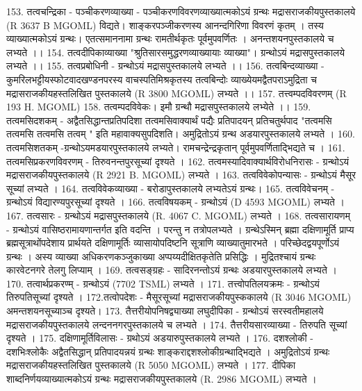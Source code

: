 153. तत्वचन्द्रिका - पञ्चीकरणव्याख्या - पञ्चीकरणविवरणव्याख्यात्मकोऽयं ग्रन्थः मद्रासराजकीयपुस्तकालये (R 3637 B MGOML) विद्यते। शाङ्करपञ्जीकरणस्य आनन्दगिरिणा विवरणं कृतम् । तस्य व्याख्यात्मकोऽयं ग्रन्थः। एतत्समाननामा ग्रन्थः रामतीर्थकृतः पूर्वमुपवर्णितः । अनन्तशयनपुस्तकालये च लभ्यते ।। 
154. तत्वदीपिकाव्याख्या "श्रुतिसारसमुद्धरणव्याख्यायाः व्याख्या"। ग्रन्थोऽयं मद्रासपुस्तकालये लभ्यते ।।
155. तत्वप्रबोधिनी - ग्रन्थोऽयं मद्रासपुस्तकालये लभ्यते ।। 
156. तत्वबिन्दव्याख्या - कुमरिलभट्टीयस्फोटवादखण्डनपरस्य वाचस्पतिमिश्रकृतस्य तत्वबिन्दोः व्याख्येयमद्वैतपराऽमुद्रिता च मद्रासराजकीयहस्तलिखित पुस्तकालये (R 3800 MGOML) लभ्यते ।। 
157. तत्त्वम्पदविवरणम् (R 193 H. MGOML) 
158. तत्वम्पदविवेकः। इमौ ग्रन्थौ मद्रासपुस्तकालये लभ्येते ।। 
159. तत्वमसिदशकम् - अद्वैतसिद्धान्तप्रतिपदिशा तत्वमसिवाक्यार्थं पद्यैः प्रतिपादयन् प्रतिचतुर्थपाद "तत्वमसि तत्वमसि तत्वमसि तत्वम् " इति महावाक्यसुपदिशति। अमुद्रितोऽयं ग्रन्थ अडयारपुस्तकालये लभ्यते ।  
160. तत्वमसिशतकम् -ग्रन्थोऽयमडयारपुस्तकालये लभ्यते। रामचन्द्रेन्द्रकृतान् पूर्वमुपवर्णिताद्भिद्यते च । 
161. तत्वमसिप्रकरणविवरणम् - तिरुवनन्तपुरसूच्यां दृश्यते ।
162. तत्वमस्यादिवाक्यार्थविरोधनिरासः - ग्रन्थोऽयं मद्रासराजकीयपुस्तकालये (R 2921 B. MGOML) लभ्यते । 
163. तत्वविवेकोपन्यासः - ग्रन्थोऽयं मैसूर सूच्यां लभ्यते । 
164. तत्वविवेकव्याख्या - बरोडापुस्तकालये लभ्यतेऽयं ग्रन्थः।
165. तत्वविवेचनम् - ग्रन्थोऽयं विद्यारण्यपुरसूच्यां दृश्यते । 
166. तत्वविषयकम् - ग्रन्थोऽयं (D 4593 MGOML) लभ्यते ।
167. तत्वसारः - ग्रन्थोऽयं मद्रासपुस्तकालये (R. 4067 C. MGOML) लभ्यते । 
168. तत्वसारायणम् - ग्रन्थोऽयं वासिष्ठरामायणान्तर्गत इति वदन्ति । परन्तु न तत्रोपलभ्यते । ग्रन्थेऽस्मिन् ब्रह्मा दक्षिणामूर्ति प्राप्य ब्रह्मसूत्राथोंपदेशाय प्रार्थयते दक्षिणामूर्तिः व्यासायोपदिष्टनि सूत्राणि व्याख्यातुमारभते । परिच्छेदद्वयपूर्णोऽयं ग्रन्थः । अस्य व्याख्या अधिकरणकञ्जुकाख्या अप्पय्यदीक्षितकृतेति प्रसिद्धिः । मुद्रितश्चायं ग्रन्थः कारवेटनगरे तेलगु लिप्याम् ।
169. तत्वसङ्ग्रहः - सादिरनन्तोऽयं ग्रन्थः अडयारपुस्तकालये लभ्यते । 
170. तत्वार्थप्रकरण्म् - ग्रन्थोऽयं (7702 TSML) लभ्यते ।
171. तत्त्वोपतिलयक्रमः - ग्रन्थोऽयं तिरुपतिसूच्यां दृश्यते ।
172.तत्वोपदेशः - मैसूरसूच्यां मद्रासराजकीयपुस्ककालये (R 3046 MGOML) अमन्तशयनसूच्याञ्च दृश्यते। 
173. तैत्तरीयोपनिषद्व्याख्या लघुदीपिका - ग्रन्थोऽयं सरस्वतीमहालये मद्रासराजकीयपुस्तकालये लन्दननगरपुस्तकालये च लभ्यते ।
174. तैत्तरीयसारव्याख्या - तिरुपति सूच्यां दृश्यते । 
175. दक्षिणामूर्तिविलासः - ग्रथोऽयं अडयारुपुस्तकालये लभ्यते । 
176. दशश्लोकी - दशभिःश्लोकैः अद्वैतसिद्धान् प्रतिपादयन्नयं ग्रन्थः शाङ्कराद्दशश्लोकीग्रन्थाद्भिद्यते । अमुद्रितोऽयं ग्रन्थः मद्रासराजकीयहस्तलिखित पुस्तकालये (R 5050 MGOML) लभ्यते । 
177. दीपिका शाब्दनिर्णयव्याख्यात्मकोऽयं ग्रन्थः मद्रासराजकीयपुस्तकालये (R. 2986 MGOML) लभ्यते । 
